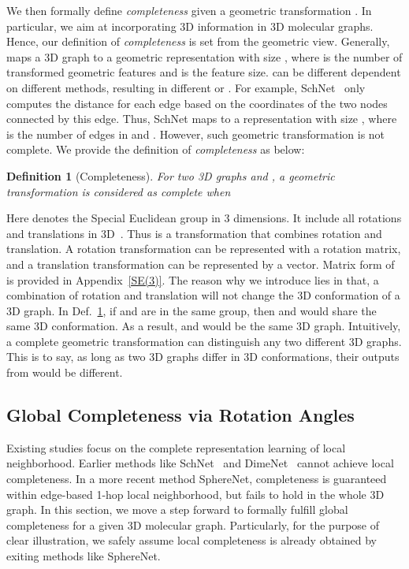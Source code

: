 \documentclass{article}
\newtheorem{definition}{Definition}
\begin{document}
We then formally define \emph{completeness} given a geometric transformation .
In particular, we aim at incorporating 3D information in 3D molecular graphs. Hence,
our definition of \emph{completeness} is set from the geometric view.
Generally,  maps a 3D graph  to a geometric representation with size \textcolor{COLOR}{, where  is the number of transformed geometric features and  is the feature size}. 
 can be different dependent on different methods, resulting in different  or
.
For example, SchNet~\citep{schutt2017schnet} \textcolor{COLOR}{only computes the distance for each edge based on the coordinates of the two nodes connected by this edge.}
Thus, SchNet maps  to a representation with size ,
where  is the number of edges in  and .
However, such geometric transformation is not complete.
We provide the definition of \emph{completeness} as below:

\begin{definition}[Completeness]
For two 3D graphs  and ,
a geometric transformation  is considered as complete when

\label{def: gt}
\end{definition}
\vspace{-20pt}
\textcolor{COLOR}{Here  denotes the Special Euclidean group in 3 dimensions. It include all rotations and translations in 3D~\citep{adams2022learning, hoogeboom2022equivariant,liu2022spherical, satorras2021n}. Thus  is a transformation that combines rotation and translation. A rotation transformation can be represented with a  rotation matrix, and a translation transformation can be represented by a  vector. Matrix form of  is provided in Appendix~\ref{SE(3)}.
The reason why we introduce  lies in that, a combination of rotation and translation will not change the 3D conformation of a 3D graph.
In Def.~\ref{def: gt}, if  and  are in the same  group, then  and  would share the same 3D conformation.
As a result,  and  would be the same 3D graph.}
Intuitively, a complete geometric transformation  can distinguish any two different 3D graphs.
This is to say, as long as two 3D graphs differ in \textcolor{COLOR}{3D conformations}, their outputs from  would be different.



\subsection{Global Completeness via Rotation Angles}   \label{sec:global}
Existing studies focus on the complete representation learning of local neighborhood.
Earlier methods like SchNet~\citep{schutt2017schnet} and DimeNet~\cite{klicpera_dimenet_2020} cannot \textcolor{COLOR}{achieve} local completeness.
In a more recent method SphereNet, completeness is guaranteed within \textcolor{COLOR}{edge-based 1-hop} local neighborhood,
but fails to hold in the whole 3D graph. 
In this section, we move a step forward to
formally fulfill global completeness  
for a given 3D molecular graph.
Particularly, for the purpose of clear illustration, we safely assume local completeness is already obtained by exiting methods like SphereNet.
\end{document}
